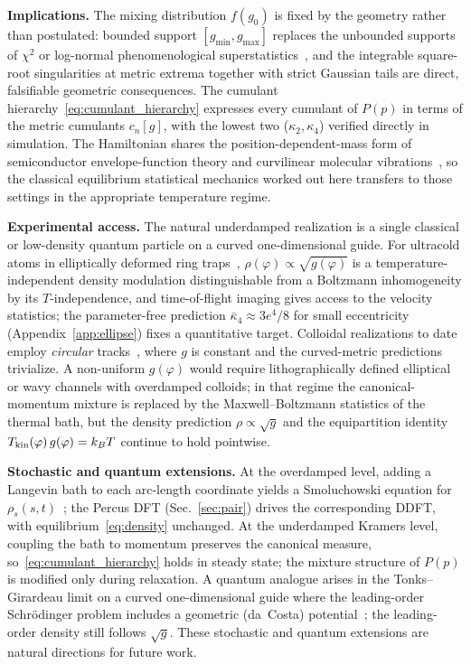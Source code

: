 \documentclass[aps,pre,twocolumn,superscriptaddress,longbibliography,floatfix]{revtex4-2}
\begin{document}
\textbf{Implications.}
The mixing distribution $f(g_0)$ is fixed by the geometry rather than postulated: bounded
support $[g_{\min},g_{\max}]$ replaces the unbounded supports of $\chi^2$ or log-normal
phenomenological superstatistics~\cite{BeckCohen2003}, and the integrable square-root
singularities at metric extrema together with strict Gaussian tails are direct, falsifiable
geometric consequences.
The cumulant hierarchy~\eqref{eq:cumulant_hierarchy} expresses every cumulant of $P(p)$
in terms of the metric cumulants $c_n[g]$, with the lowest two ($\kappa_2,\kappa_4$)
verified directly in simulation.
The Hamiltonian shares the position-dependent-mass form of semiconductor envelope-function
theory and curvilinear molecular vibrations~\cite{BenDanielDuke1966,vonRoos1983}, so the
classical equilibrium statistical mechanics worked out here transfers to those settings
in the appropriate temperature regime.

\textbf{Experimental access.}
The natural underdamped realization is a single classical or low-density quantum particle
on a curved one-dimensional guide.
For ultracold atoms in elliptically deformed ring traps~\cite{Ryu2007,Eckel2014},
$\rho(\varphi)\propto\sqrt{g(\varphi)}$ is a temperature-independent density modulation
distinguishable from a Boltzmann inhomogeneity by its $T$-independence, and time-of-flight
imaging gives access to the velocity statistics; the parameter-free prediction
$\bar\kappa_4\approx 3e^4/8$ for small eccentricity (Appendix~\ref{app:ellipse}) fixes a quantitative target.
Colloidal realizations to date employ \emph{circular}
tracks~\cite{CastroVillarrealRamirez2021,CastroVillarreal2023}, where $g$ is constant and
the curved-metric predictions trivialize.
A non-uniform $g(\varphi)$ would require lithographically defined elliptical or wavy
channels with overdamped colloids; in that regime the canonical-momentum mixture is
replaced by the Maxwell--Boltzmann statistics of the thermal bath, but the density
prediction $\rho\propto\sqrt{g}$ and the equipartition identity
$T_{\rm kin}(\varphi)\,g(\varphi)=k_BT$ continue to hold pointwise.

\textbf{Stochastic and quantum extensions.}
At the overdamped level, adding a Langevin bath to each arc-length coordinate yields a
Smoluchowski equation for $\rho_s(s,t)$~\cite{Stratonovich1968,Graham1977}; the Percus DFT
(Sec.~\ref{sec:pair}) drives the corresponding DDFT, with equilibrium~\eqref{eq:density}
unchanged.
At the underdamped Kramers level, coupling the bath to momentum preserves the canonical
measure, so~\eqref{eq:cumulant_hierarchy} holds in steady state; the mixture
structure of $P(p)$ is modified only during relaxation.
A quantum analogue arises in the Tonks--Girardeau limit on a curved one-dimensional
guide where the leading-order Schr\"odinger problem includes a geometric (da~Costa)
potential~\cite{daCosta1981}; the leading-order density still follows $\sqrt{g}$.
These stochastic and quantum extensions are natural directions for future work.
\end{document}
